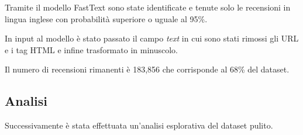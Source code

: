 Tramite il modello FastText \cite{joulin2016bag} sono state identificate e tenute 
solo le recensioni in lingua inglese con probabilità superiore o uguale al 95\%.

In input al modello è stato passato il campo \textit{text} in cui sono stati rimossi gli URL e i tag HTML e infine trasformato in minuscolo.

Il numero di recensioni rimanenti è 183,856 che corrisponde al 68\% del dataset.


\subsection{Analisi}
Successivamente è stata effettuata un'analisi esplorativa del dataset pulito.
